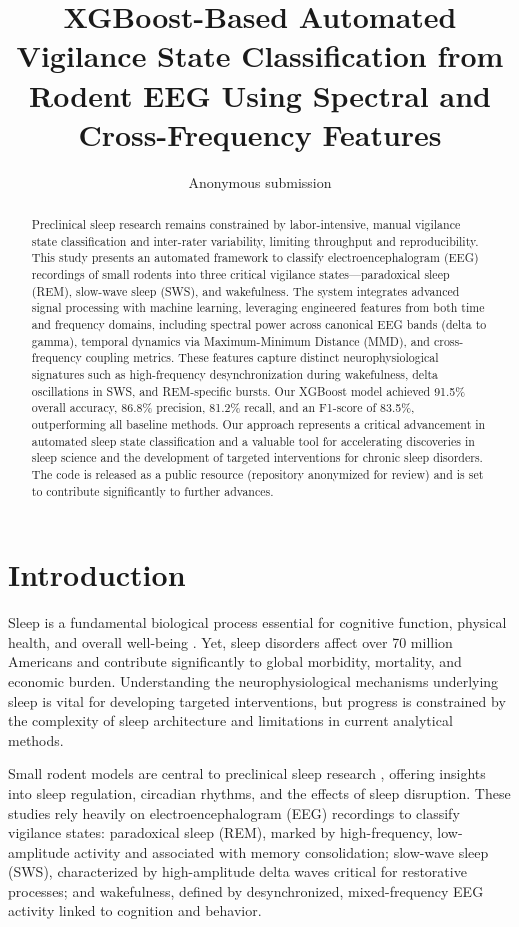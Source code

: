 \documentclass[letterpaper]{article} %
\title{XGBoost-Based Automated Vigilance State Classification from Rodent EEG Using Spectral and Cross-Frequency Features}
\author{
    Anonymous submission
}
\begin{document}
\maketitle

\begin{abstract}
Preclinical sleep research remains constrained by labor-intensive, manual vigilance state classification and inter-rater variability, limiting throughput and reproducibility. This study presents an automated framework to classify electroencephalogram (EEG) recordings of small rodents into three critical vigilance states---paradoxical sleep (REM), slow-wave sleep (SWS), and wakefulness. The system integrates advanced signal processing with machine learning, leveraging engineered features from both time and frequency domains, including spectral power across canonical EEG bands (delta to gamma), temporal dynamics via Maximum-Minimum Distance (MMD), and cross-frequency coupling metrics. These features capture distinct neurophysiological signatures such as high-frequency desynchronization during wakefulness, delta oscillations in SWS, and REM-specific bursts. Our XGBoost model achieved 91.5\% overall accuracy, 86.8\% precision, 81.2\% recall, and an F1-score of 83.5\%, outperforming all baseline methods. Our approach represents a critical advancement in automated sleep state classification and a valuable tool for accelerating discoveries in sleep science and the development of targeted interventions for chronic sleep disorders. The code is released as a public resource (repository anonymized for review) and is set to contribute significantly to further advances.
\end{abstract}

\section{Introduction}
Sleep is a fundamental biological process essential for cognitive function, physical health, and overall well-being \citep{walker2009role}. Yet, sleep disorders affect over 70 million Americans and contribute significantly to global morbidity, mortality, and economic burden. Understanding the neurophysiological mechanisms underlying sleep is vital for developing targeted interventions, but progress is constrained by the complexity of sleep architecture and limitations in current analytical methods.

Small rodent models are central to preclinical sleep research \citep{rechtschaffen2002sleep}, offering insights into sleep regulation, circadian rhythms, and the effects of sleep disruption. These studies rely heavily on electroencephalogram (EEG) recordings to classify vigilance states: paradoxical sleep (REM), marked by high-frequency, low-amplitude activity and associated with memory consolidation; slow-wave sleep (SWS), characterized by high-amplitude delta waves critical for restorative processes; and wakefulness, defined by desynchronized, mixed-frequency EEG activity linked to cognition and behavior.
\end{document}
